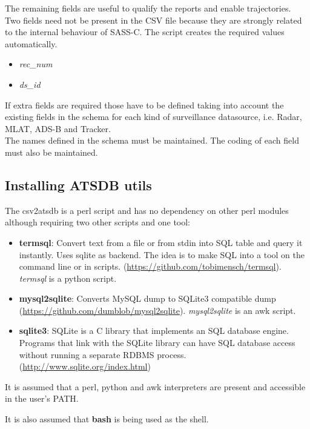The remaining fields are useful to qualify the reports and enable trajectories. \\

\newpage
Two fields need not be present in the CSV file because they are strongly related to the internal behaviour of SASS-C. The script creates the required values automatically.
\begin{itemize}
\item \textit{rec\_num}
\item \textit{ds\_id}
\\
\end{itemize}

If extra fields are required those have to be defined taking into account the existing fields in the schema for each kind of surveillance datasource, i.e. Radar, MLAT, ADS-B and Tracker. \\

The names defined in the schema must be maintained. The coding of each field must also be maintained.

\subsection{Installing ATSDB utils}

The csv2atsdb is a perl script and has no dependency on other perl modules although requiring two other scripts and one tool:
\begin{itemize}
\item \textbf{termsql}: Convert text from a file or from stdin into SQL table and query it instantly. Uses sqlite as backend. The idea is to make SQL into a tool on the command line or in scripts. (\url{https://github.com/tobimensch/termsql}). \textit{termsql} is a python script.
\item \textbf{mysql2sqlite}: Converts MySQL dump to SQLite3 compatible dump (\url{https://github.com/dumblob/mysql2sqlite}). \textit{mysql2sqlite} is an awk script.
\item \textbf{sqlite3}: SQLite is a C library that implements an SQL database engine. Programs that link with the SQLite library can have SQL database access without running a separate RDBMS process. (\url{http://www.sqlite.org/index.html})
\\
\end{itemize}

It is assumed that a perl, python and awk interpreters are present and accessible in the user's PATH.

It is also assumed that \textbf{bash} is being used as the shell. \\

